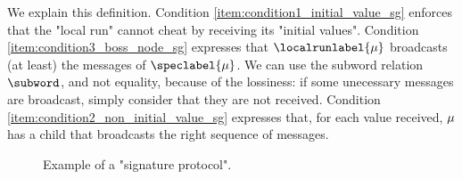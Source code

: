 We explain this definition. Condition \ref{item:condition1_initial_value_sg} enforces that the "local run" cannot cheat by receiving its "initial values". 
 Condition \ref{item:condition3_boss_node_sg} expresses that $\localrunlabel{\node}$ broadcasts (at least) the messages of $\speclabel{\node}$. We can use the subword relation $\subword$, and not equality, because of the lossiness: if some unecessary messages are broadcast, simply consider that they are not received.
Condition \ref{item:condition2_non_initial_value_sg} expresses that, for each value received, $\mu$ has a child that broadcasts the right sequence of messages.

\begin{figure}[t]
	\centering
	\resizebox*{!}{3.5cm}{
	
	}
	\caption{Example of a "signature protocol".}\label{fig:ex2}\label{fig:example-signature-protocol}
\end{figure}
